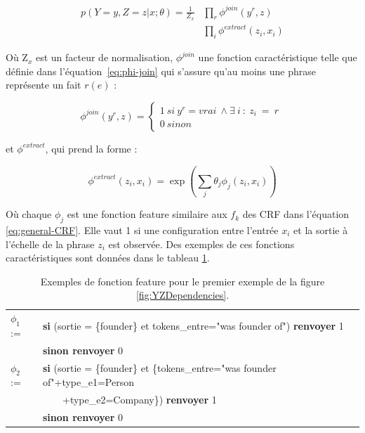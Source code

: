 \documentclass[PhD-Yoann-Dupont.tex]{subfiles}
\begin{document}
\begin{equation} \label{eq:joint-conditional-probability}
\begin{aligned}
p(Y=y,Z=z|x;\theta) = \frac{1}{Z_x} & \prod_r \phi^{join} (y^r,z) \\
                                    & \prod_i\phi^{extract} (z_i,x_i)
\end{aligned}
\end{equation}

Où Z$_{x}$ est un facteur de normalisation, $\phi^{join}$ une fonction caractéristique telle que définie dans l'équation\ \ref{eq:phi-join} qui s'assure qu'au moins une phrase représente un fait $r(e)$ :

\begin{equation} \label{eq:phi-join}
\phi^{join} (y^r,z) = \left\{
  \begin{array}{lr}
    1\ si\ y^r=vrai\ \wedge \exists\ i\ :\ z_i\ =\ r\ \\
    0\ sinon
  \end{array}
\right.
\end{equation}

et $\phi^{extract}$, qui prend la forme :

\begin{equation} \label{eq:phi-extract}
\phi^{extract} (z_{i},x_{i}) = \exp \left( \sum_{j} \theta_{j} \phi_{j} (z_{i},x_{i}) \right)
\end{equation}

Où chaque $\phi_{j}$ est une fonction feature similaire aux $f_{k}$ des CRF dans l'équation \ref{eq:general-CRF}. Elle vaut 1 si une configuration entre l'entrée $x_{i}$ et la sortie à l'échelle de la phrase $z_{i}$ est observée. Des exemples de ces fonctions caractéristiques sont données dans le tableau \ref{tab:multir-feature-function-example}.

\begin{table}[ht!]
\begin{tabular}{ll}
$\phi_{1}$ := & \textbf{si} (sortie = \{founder\} et tokens\_entre="was founder of") \textbf{renvoyer} 1 \\
              & \textbf{sinon renvoyer} 0 \\
$\phi_{2}$ := & \textbf{si} (sortie = \{founder\} et \{tokens\_entre="was founder of"+type\_e1=Person \\
              & \ \ \ \ +type\_e2=Company\}) \textbf{renvoyer} 1 \\
              & \textbf{sinon renvoyer} 0 \\
\end{tabular}
\caption{Exemples de fonction feature pour le premier exemple de la figure \ref{fig:YZDependencies}.}
\label{tab:multir-feature-function-example}
\end{table}
\end{document}
